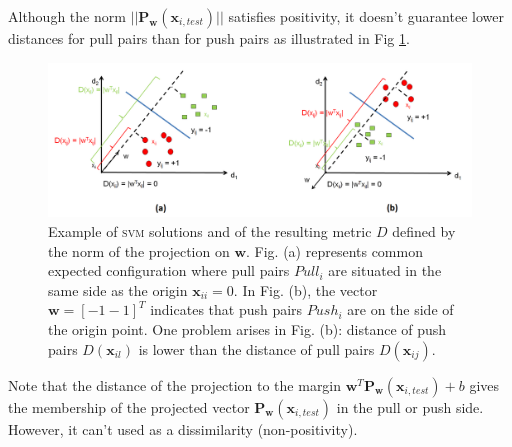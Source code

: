 \noindent Although the norm $||\textbf{P}_\textbf{w}(\textbf{x}_{i,test})||$ satisfies positivity, it doesn’t guarantee lower distances for pull pairs than for push pairs as illustrated in Fig \ref{fig:Dissimilarity_def_norm_scalar_product}. 

\begin{figure}[h!]
	\centering
	\includegraphics[width=1\linewidth]{images/Dissimilarity_def_norm_scalar_product}
	\caption{Example of \textsc{svm} solutions and of the resulting metric $D$ defined by the norm of the projection on $\textbf{w}$. Fig. (a) represents common expected configuration where pull pairs $Pull_i$ are situated in the same side as the origin $\textbf{x}_{ii}=0$. In Fig. (b), the vector $\textbf{w}=[-1 -1]^T$ indicates that push pairs $Push_i$ are on the side of the origin point. One problem arises in Fig. (b): distance of push pairs $D(\textbf{x}_{il})$ is lower than the distance of pull pairs $D(\textbf{x}_{ij})$.}
	\label{fig:Dissimilarity_def_norm_scalar_product}
\end{figure}

Note that the distance of the projection to the margin $\textbf{w}^T \textbf{P}_\textbf{w}(\textbf{x}_{i,test}) + b$ gives the membership of the projected vector $\textbf{P}_\textbf{w}(\textbf{x}_{i,test})$ in the pull or push side. However, it can't used as a dissimilarity (non-positivity). 

